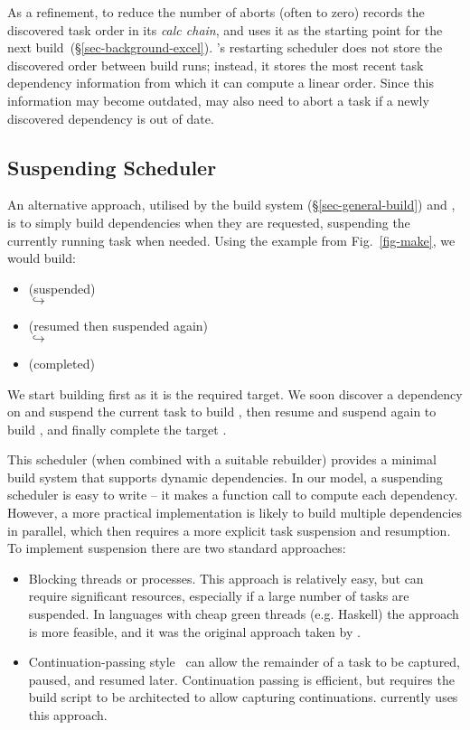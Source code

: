 As a refinement, to reduce the number of aborts (often to zero) \Excel records
the discovered task order in its \emph{calc chain}, and uses it as the starting
point for the next build~(\S\ref{sec-background-excel}). \Bazel's restarting
scheduler does not store the discovered order between build runs; instead, it
stores the most recent task dependency information from which it can compute a
linear order. Since this information may become outdated, \Bazel may also need
to abort a task if a newly discovered dependency is out of date.

\subsection{Suspending Scheduler}\label{sec-suspending}

An alternative approach, utilised by the  build system
(\S\ref{sec-general-build}) and \Shake, is to simply build dependencies when
they are requested, suspending the currently running task when needed. Using the
example from Fig.~\ref{fig-make}, we would build:

\begin{itemize}
\item {} (suspended)\\
  $\hookrightarrow$ 
\item {} (resumed then suspended again)\\
  $\hookrightarrow$   
\item {} (completed)
\end{itemize}

\noindent
We start building  first as it is the required target. We soon
discover a dependency on  and suspend the current task
 to build , then resume and suspend again to build
, and finally complete the target .

This scheduler (when combined with a suitable rebuilder) provides a minimal
build system that supports dynamic dependencies. In our model, a suspending
scheduler is easy to write -- it makes a function call to compute each
dependency. However, a more practical implementation is likely to build multiple
dependencies in parallel, which then requires a more explicit task suspension
and resumption. To implement suspension there are two standard approaches:

\begin{itemize}
\item Blocking threads or processes. This approach is relatively easy, but can
require significant resources, especially if a large number of tasks are
suspended. In languages with cheap green threads (e.g. Haskell) the approach is
more feasible, and it was the original approach taken by \Shake.
\item Continuation-passing style~\cite{claessen_continuations} can allow the
remainder of a task to be captured, paused, and resumed later. Continuation
passing is efficient, but requires the build script to be architected to allow
capturing continuations. \Shake currently uses this approach.
\end{itemize}

